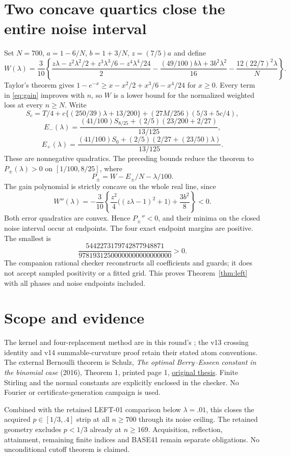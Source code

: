 \documentclass[11pt]{article}
\begin{document}
\section{Two concave quartics close the entire noise interval}
Set $N=700$, $a=1-6/N$, $b=1+3/N$, $z=(7/5)a$ and define
\[
 W(\lambda)=\frac3{10}\left\{
 \frac{z\lambda-z^2\lambda^2/2+z^3\lambda^3/6-z^4\lambda^4/24}{2}
 -\frac{(49/100)b\lambda+3b^2\lambda^2}{16}
 -\frac{12(22/7)^2\lambda}{N}\right\}.
\]
Taylor's theorem gives $1-e^{-x}\ge x-x^2/2+x^3/6-x^4/24$ for $x\ge0$.
Every term in \eqref{eq:gain} improves with $n$, so $W$ is a lower bound
for the normalized weighted loss at every $n\ge N$.
Write
\[
 S_c=T/4+c\{(250/39)\lambda+13/200\}
                  +(27M/256)(5/3+5c/4),
\]
\[
 E_-(\lambda)=\frac{(41/100)S_{8/25}+(2/5)(23/200+2/27)}{13/125},
\]
\[
 E_+(\lambda)=\frac{(41/100)S_0+(2/5)(2/27+(23/50)\lambda)}{13/125}.
\]
These are nonnegative quadratics. The preceding bounds reduce the theorem
to $P_\pm(\lambda)>0$ on $[1/100,8/25]$, where
\[
                  P_\pm=W-E_\pm/N-\lambda/100.
\]
The gain polynomial is strictly concave on the whole real line, since
\[
 W''(\lambda)=-\frac3{10}\left\{
 \frac{z^2}{4}\bigl((z\lambda-1)^2+1\bigr)+\frac{3b^2}{8}\right\}<0.
\]
Both error quadratics are convex. Hence $P_\pm''<0$, and their minima
on the closed noise interval occur at endpoints. The four exact endpoint
margins are positive. The smallest is
\[
 \frac{5442273179742877948871}{97819312500000000000000000}>0.
\]
The companion rational checker reconstructs all coefficients and guards;
it does not accept sampled positivity or a fitted grid. This proves
Theorem~\ref{thm:left} with all phases and noise endpoints included.

\section*{Scope and evidence}
The kernel and four-replacement method are in this round's
; the v13 crossing identity and v14 summable-curvature
proof retain their stated atom conventions. The external Bernoulli theorem
is Schulz, \emph{The optimal Berry--Esseen constant in the binomial case}
(2016), Theorem 1, printed page 1,
\href{https://d-nb.info/1197702695/34}{original thesis}.
Finite Stirling and the normal constants are explicitly enclosed in the
checker. No Fourier or certificate-generation campaign is used.

Combined with the retained LEFT-01 comparison below $\lambda=.01$, this
closes the acquired $p\in[1/3,.4]$ strip at all $n\ge700$ through its noise
ceiling. The retained geometry excludes $p<1/3$ already at $n\ge169$.
Acquisition, reflection, attainment, remaining finite indices and BASE41
remain separate obligations. No unconditional cutoff theorem is claimed.
\end{document}
